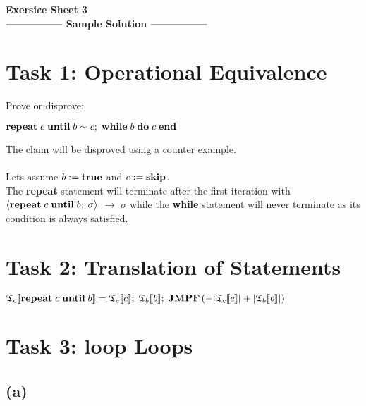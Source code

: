 \documentclass[12pt]{scrartcl}
\newcommand{\eState}[2]{$\left\langle \text{#1},\; \text{#2}\right\rangle$}
\newcommand{\eRule}[3]{\eState{#1}{#2} $\rightarrow$ #3}
\newcommand{\lbr}{[\![}
\newcommand{\rbr}{]\!]}
\newcommand{\T}{\mathfrak{T}}
\newcommand{\rep}{\text{\textbf{repeat}}}
\newcommand{\un}{\text{\textbf{until}}}
\newcommand{\jmpf}{\text{\textbf{JMPF}}}
\begin{document}
\begin{center}
	\huge\textbf{Exersice Sheet 3}\\[0.5cm]
	
	\Large
	$\mathrel{\vcenter{\hbox{\rule{2cm}{0.5pt}}}}$ \textbf{Sample 				Solution} $\mathrel{\vcenter{\hbox{\rule{2cm}{0.5pt}}}}$\\[1cm]
\end{center}
	\large

	\section*{Task 1: Operational Equivalence}
	
	\indent\indent Prove or disprove:\\
	\begin{center}
		$\text{\textbf{repeat}}\; c\; \text{\textbf{until}}\; b \sim c;\; \text{\textbf{while}}\; b\; \text{\textbf{do}}\; c\; \text{\textbf{end}}$
	\end{center}
	\indent\indent The claim will be disproved using a counter example.\\\\
	\indent Lets assume $b:=\text{\textbf{true}}$ and $c:=\text{\textbf{skip}}$.\\
	\indent The \textbf{repeat} statement will terminate after the first iteration with\\\indent \eRule{$\text{\textbf{repeat}}\; c\; \text{\textbf{until}}\; b$}{$\sigma$}{$\sigma$} while the \textbf{while} statement will never terminate as \indent its condition is always satisfied.
	
	\section*{Task 2: Translation of Statements}

		\begin{center}
			$\T_{c}\lbr\rep\;c\;\un\;b\rbr =\T_{c}\lbr c\rbr ;\;\T_{b}\lbr b\rbr ;\; \jmpf\left(-|\T_{c}\lbr c\rbr |+|\T_{b}\lbr b\rbr |\right)$
		\end{center}
		
	\section*{Task 3: loop Loops}
	
	\subsection*{(a)}
	
\end{document}
